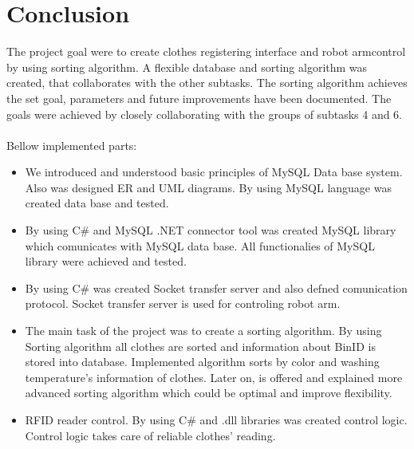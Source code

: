 \section{Conclusion}


The project goal were to create clothes registering interface and robot armcontrol by using sorting algorithm. A flexible database and sorting algorithm was created, that collaborates with the other subtasks. The sorting algorithm achieves the set goal, parameters and future improvements have been documented. The goals were achieved by closely collaborating with the groups of subtasks 4 and 6. 
\\ \\
Bellow implemented parts:
\\
\begin{itemize}
	\item We introduced and understood basic principles of MySQL Data base system. Also was designed ER and UML diagrams. By using MySQL language was created data base and tested.

	\item By using C\# and MySQL .NET connector tool was created MySQL library which comunicates with MySQL data base. All functionalies of MySQL library were achieved and tested.

	\item By using C\# was created Socket transfer server and also defned comunication protocol. Socket transfer server is used for controling robot arm.

	\item The main task of the project was to create a sorting algorithm. By using Sorting algorithm all clothes are sorted and information about BinID is stored into
database. Implemented algorithm sorts by color and washing temperature's information of clothes. Later on, is offered and explained more advanced sorting algorithm which could be optimal and improve flexibility.

	\item RFID reader control. By using C\# and .dll libraries was created control logic. Control logic takes care of reliable clothes' reading.
\end{itemize}